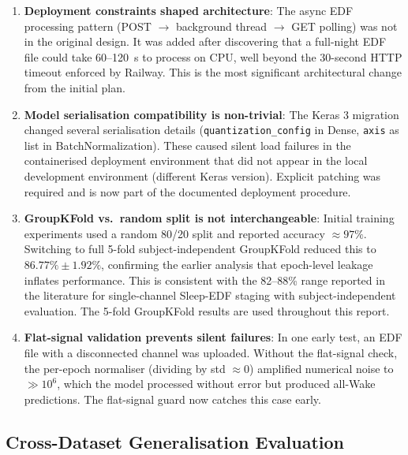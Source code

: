 \documentclass[10pt]{article}
\begin{document}
\begin{enumerate}
  \item \textbf{Deployment constraints shaped architecture}: The async EDF processing pattern (POST $\rightarrow$ background thread $\rightarrow$ GET polling) was not in the original design. It was added after discovering that a full-night EDF file could take 60--120~s to process on CPU, well beyond the 30-second HTTP timeout enforced by Railway. This is the most significant architectural change from the initial plan.

  \item \textbf{Model serialisation compatibility is non-trivial}: The Keras 3 migration changed several serialisation details (\texttt{quantization\_config} in Dense, \texttt{axis} as list in BatchNormalization). These caused silent load failures in the containerised deployment environment that did not appear in the local development environment (different Keras version). Explicit patching was required and is now part of the documented deployment procedure.

  \item \textbf{GroupKFold vs.\ random split is not interchangeable}: Initial training experiments used a random 80/20 split and reported accuracy $\approx 97\%$. Switching to full 5-fold subject-independent GroupKFold reduced this to $86.77\% \pm 1.92\%$, confirming the earlier analysis that epoch-level leakage inflates performance. This is consistent with the 82--88\% range reported in the literature for single-channel Sleep-EDF staging with subject-independent evaluation. The 5-fold GroupKFold results are used throughout this report.

  \item \textbf{Flat-signal validation prevents silent failures}: In one early test, an EDF file with a disconnected channel was uploaded. Without the flat-signal check, the per-epoch normaliser (dividing by std $\approx 0$) amplified numerical noise to $\gg 10^6$, which the model processed without error but produced all-Wake predictions. The flat-signal guard now catches this case early.
\end{enumerate}


\subsection{Cross-Dataset Generalisation Evaluation}
\label{sec:crossDataset}
\end{document}
